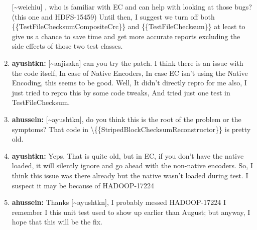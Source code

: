 \documentclass{report}%
\begin{document}
\begin{enumerate}
\newline%
\newline%
{[}\textasciitilde{}weichiu{]} , who is familiar with EC and can help with looking at those bugs? (this one and HDFS{-}15459)\newline%
\newline%
 Until then, I suggest we turn off both \{\{TestFileChecksumCompositeCrc\}\} and \{\{TestFileChecksum\}\} at least to give us a chance\newline%
\newline%
 to save time and get more accurate reports excluding the side effects of those two test classes.%
\item%
\textbf{ayushtkn: }{[}\textasciitilde{}aajisaka{]} can you try the patch. I think there is an issue with the code itself, In case of Native Encoders, In case EC isn't using the Native Encoding, this seems to be good. Well, It didn't directly repro for me also, I just tried to repro this by some code tweaks, And tried just one test in TestFileChecksum. %
\item%
\textbf{ahussein: }{[}\textasciitilde{}ayushtkn{]}, do you think this is the root of the problem or the symptoms?\newline%
\newline%
\newline%
\newline%
That code in \textbackslash{}\{\{StripedBlockChecksumReconstructor\}\} is pretty old.%
\item%
\textbf{ayushtkn: }Yeps, That is quite old, but in EC, if you don't have the native loaded, it will silently ignore and go ahead with the non{-}native encoders. So, I think this issue was there already but the native wasn't loaded during test.\newline%
\newline%
I suspect it may be because of HADOOP{-}17224%
\item%
\textbf{ahussein: }Thanks {[}\textasciitilde{}ayushtkn{]}, I probably messed HADOOP{-}17224\newline%
\newline%
\newline%
\newline%
I remember I this unit test used to show up earlier than August; but anyway, I hope that this will be the fix.\newline%
\newline%
\newline%
\newline%
\newline%

\end{enumerate}
\end{document}
